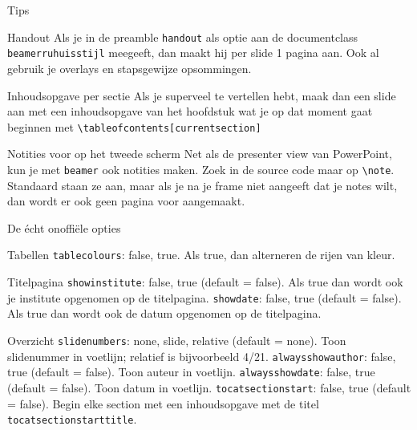 \documentclass[department=none, notes={show notes}, slidesperpage=4, official=true, handout]{beamerruhuisstijl}
\begin{document}
\begin{frame}{Tips}
    \begin{block}{Handout}
        Als je in de preamble \texttt{handout} als optie aan de documentclass \texttt{beamerruhuisstijl} meegeeft, dan maakt hij per slide 1 pagina aan. Ook al gebruik je overlays en stapsgewijze opsommingen.
    \end{block}

    \begin{block}{Inhoudsopgave per sectie}
        Als je superveel te vertellen hebt, maak dan een slide aan met een inhoudsopgave van het hoofdstuk wat je op dat moment gaat beginnen met \texttt{\textbackslash tableofcontents[currentsection]}
    \end{block}

    \begin{block}{Notities voor op het tweede scherm}
        Net als de presenter view van PowerPoint, kun je met \texttt{beamer} ook notities maken. Zoek in de source code maar op \texttt{\textbackslash note}. Standaard staan ze aan, maar als je na je frame niet aangeeft dat je notes wilt, dan wordt er ook geen pagina voor aangemaakt. 
    \end{block}
\end{frame}
\note{}

\begin{frame}{De \'echt onoffi\"ele opties}
\begin{block}{Tabellen}
	\texttt{tablecolours}: false, true. Als true, dan alterneren de rijen van kleur.
\end{block}

\begin{block}{Titelpagina}
	\texttt{showinstitute}: false, true (default = false). Als true dan wordt ook je institute opgenomen op de titelpagina.
    \texttt{showdate}: false, true (default = false). Als true dan wordt ook de datum opgenomen op de titelpagina.
\end{block}

\begin{block}{Overzicht}
	\texttt{slidenumbers}: none, slide, relative (default = none). Toon slidenummer in voetlijn; relatief is bijvoorbeeld 4/21.
	\texttt{alwaysshowauthor}: false, true (default = false). Toon auteur in voetlijn.
	\texttt{alwaysshowdate}: false, true (default = false). Toon datum in voetlijn.
	\texttt{tocatsectionstart}: false, true (default = false). Begin elke section met een inhoudsopgave met de titel \texttt{tocatsectionstarttitle}.
\end{block}
\end{frame}
\note{}
\end{document}
